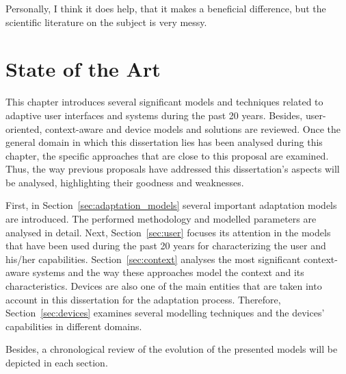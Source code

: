 

\begin{savequote}[50mm]
Personally, I think it does help, that it makes a beneficial difference, but the scientific literature on the subject is very messy.
%
\end{savequote}


\chapter{State of the Art}
\label{cha:state_of_the_art}

\ifpdf
    \graphicspath{{2_state_of_the_art/figures/PNG/}{2_state_of_the_art/figures/PDF/}{2_state_of_the_art/figures/}}
\else
    \graphicspath{{2_state_of_the_art/figures/EPS/}{2_state_of_the_art/figures/}}
\fi


This chapter introduces several significant models and techniques related to 
adaptive user interfaces and systems during the past 20 years. Besides, user-oriented,
context-aware and device models and solutions are reviewed. Once the general
domain in which this dissertation lies has been analysed during this chapter,
the specific approaches that are close to this proposal are examined. Thus, 
the way previous proposals have addressed this dissertation's aspects will be 
analysed, highlighting their goodness and weaknesses.  

First, in Section~\ref{sec:adaptation_models} several important adaptation models
are introduced. The performed methodology and modelled parameters are analysed in
detail. Next, Section~\ref{sec:user} focuses its attention in the models
that have been used during the past 20 years for characterizing the user and his/her
capabilities. Section~\ref{sec:context} analyses the most significant
context-aware systems and the way these approaches model the context and its
characteristics. Devices are also one of the main entities that are taken into
account in this dissertation for the adaptation process. Therefore, Section~\ref{sec:devices}
examines several modelling techniques and the devices' capabilities in different
domains.

Besides, a chronological review of the evolution of the presented models will be
depicted in each section.






